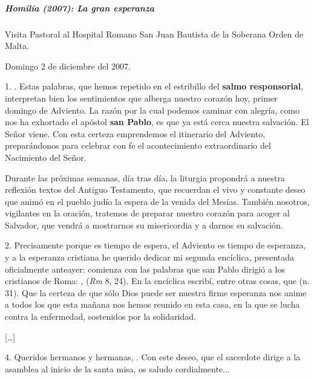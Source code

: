 \subparagraph{Homilía (2007): La gran 	esperanza}\label{homiluxeda-la-gran-esperanza}

Visita Pastoral al Hospital Romano San Juan Bautista de la Soberana Orden de Malta.

Domingo 2 de diciembre del 2007.

1. . Estas palabras, que hemos repetido en el estribillo del \textbf{salmo responsorial}, interpretan bien los sentimientos que alberga nuestro corazón hoy, primer domingo de Adviento. La razón por la cual podemos caminar con alegría, como nos ha exhortado el apóstol \textbf{san Pablo}, es que ya está cerca nuestra salvación. El Señor viene. Con esta certeza emprendemos el itinerario del Adviento, preparándonos para celebrar con fe el acontecimiento extraordinario del Nacimiento del Señor.

Durante las próximas semanas, día tras día, la liturgia propondrá a nuestra reflexión textos del Antiguo Testamento, que recuerdan el vivo y constante deseo que animó en el pueblo judío la espera de la venida del Mesías. También nosotros, vigilantes en la oración, tratemos de preparar nuestro corazón para acoger al Salvador, que vendrá a mostrarnos su misericordia y a darnos su salvación.

2. Precisamente porque es tiempo de espera, el Adviento es tiempo de esperanza, y a la esperanza cristiana he querido dedicar mi segunda encíclica, presentada oficialmente anteayer: comienza con las palabras que san Pablo dirigió a los cristianos de Roma: \emph{},  (\emph{Rm} 8, 24). En la encíclica escribí, entre otras cosas, que  (n. 31). Que la certeza de que sólo Dios puede ser nuestra firme esperanza nos anime a todos los que esta mañana nos hemos reunido en esta casa, en la que se lucha contra la enfermedad, sostenidos por la solidaridad.

{[}\ldots{}{]}

4. Queridos hermanos y hermanas, . Con este deseo, que el sacerdote dirige a la asamblea al inicio de la santa misa, os saludo cordialmente...

